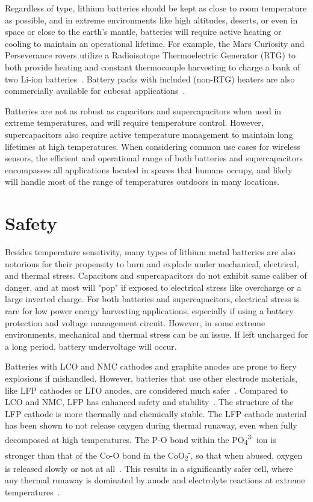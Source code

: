 Regardless of type, lithium batteries should be kept as close to room temperature as possible, and in extreme environments like high altitudes, deserts, or even in space or close to the earth's mantle, batteries will require active heating or cooling to maintain an operational lifetime. For example, the Mars Curiosity and Perseverance rovers utilize a Radioisotope Thermoelectric Generator (RTG) to both provide heating and constant thermocouple harvesting to charge a bank of two Li-ion batteries~\cite{nasaPerseverance}. Battery packs with included (non-RTG) heaters are also commercially available for cubesat applications~\cite{nanopowerbpx}.

Batteries are not as robust as capacitors and supercapacitors when used in extreme temperatures, and will require temperature control. However, 
supercapacitors also require active temperature management to maintain long lifetimes at high temperatures. When considering common use cases for wireless sensors, the efficient and operational range of both batteries and supercapacitors encompasses all applications located in spaces that humans occupy, and likely will handle most of the range of temperatures outdoors in many locations.

\section{Safety} 
Besides temperature sensitivity, many types of lithium metal batteries are also notorious for their propensity to burn and explode under mechanical, electrical, and thermal stress.
Capacitors and supercapacitors do not exhibit same caliber of danger, and at most will "pop" if exposed to electrical stress like overcharge or a large inverted charge. 
For both batteries and supercapacitors, electrical stress is rare for low power energy harvesting applications, especially if using a battery protection and voltage management circuit. However, in some extreme environments, mechanical and thermal stress can be an issue. If left uncharged for a long period, battery undervoltage will occur. 

Batteries with LCO and NMC cathodes and graphite anodes are prone to fiery explosions if mishandled. However, 
batteries that use other electrode materials, like LFP cathodes or LTO anodes, are considered much safer~\cite{doughty2012general,nitta2015li,belharouakElectrochemistry11,larssonAbuse14}.
Compared to LCO and NMC, LFP has enhanced safety and stability~\cite{larssonAbuse14}. The structure of the LFP cathode is more thermally and chemically stable.  
The LFP cathode material has been shown to not release oxygen during thermal runaway, even when fully decomposed at high temperatures. 
The P-O bond within the PO\textsubscript{4}\textsuperscript{3-} ion is stronger than that of the Co-O bond in the CoO\textsubscript{2}\textsuperscript{-}, so that when abused, oxygen is released slowly or not at all~\cite{nitta2015li}.
This results in a significantly safer cell, where any thermal runaway is dominated by anode and electrolyte reactions at extreme temperatures~\cite{doughty2012general}.

